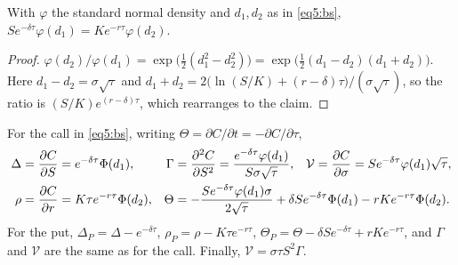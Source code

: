 \begin{chapterrefs}
\begin{lemma}\label{lem5:phi}
With $\varphi$ the standard normal density and $d_1,d_2$ as in \cref{eq5:bs},
$Se^{-\delta\tau}\varphi(d_1)=Ke^{-r\tau}\varphi(d_2)$.
\end{lemma}

\begin{proof}
$\varphi(d_2)/\varphi(d_1)=\exp\bigl(\tfrac12(d_1^2-d_2^2)\bigr)=\exp\bigl(\tfrac12(d_1-d_2)(d_1+d_2)\bigr)$.
Here $d_1-d_2=\sigma\sqrt\tau$ and $d_1+d_2=2\bigl(\ln(S/K)+(r-\delta)\tau\bigr)/(\sigma\sqrt\tau)$, so the
ratio is $(S/K)e^{(r-\delta)\tau}$, which rearranges to the claim.
\end{proof}

\begin{proposition}\label{prop5:greeks}
For the call in \cref{eq5:bs}, writing $\Theta=\partial C/\partial t=-\partial C/\partial\tau$,
\begin{align*}
  \Delta&=\frac{\partial C}{\partial S}=e^{-\delta\tau}\Phi(d_1), &
  \Gamma&=\frac{\partial^2C}{\partial S^2}=\frac{e^{-\delta\tau}\varphi(d_1)}{S\sigma\sqrt\tau}, &
  \mathcal V&=\frac{\partial C}{\partial\sigma}=Se^{-\delta\tau}\varphi(d_1)\sqrt\tau,\\
  \rho&=\frac{\partial C}{\partial r}=K\tau e^{-r\tau}\Phi(d_2), &
  \Theta&=-\frac{Se^{-\delta\tau}\varphi(d_1)\sigma}{2\sqrt\tau}+\delta Se^{-\delta\tau}\Phi(d_1)-rKe^{-r\tau}\Phi(d_2). \span\span
\end{align*}
For the put, $\Delta_P=\Delta-e^{-\delta\tau}$, $\rho_P=\rho-K\tau e^{-r\tau}$,
$\Theta_P=\Theta-\delta Se^{-\delta\tau}+rKe^{-r\tau}$, and $\Gamma$ and $\mathcal V$ are the same as for the call.
Finally, $\mathcal V=\sigma\tau S^2\Gamma$.
\end{proposition}


\end{chapterrefs}

